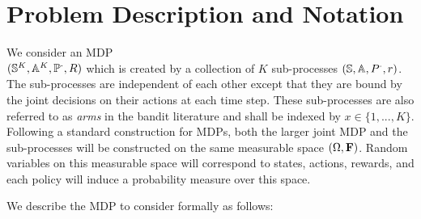 \section{Problem Description and Notation}\label{prob_desc}
We consider an MDP \\ $(\mathbb{S}^K,\mathbb{A}^K,\mathbb{P}^{\cdot},R)$ which is created by a collection of $K$ sub-processes $(\mathbb{S},\mathbb{A},P^{\cdot},r)$. The sub-processes are independent of each other except that they are bound by the joint decisions on their actions at each time step. These sub-processes are also referred to as {\it arms} in the bandit literature and shall be indexed by $x\in\{1,...,K\}$. 
Following a standard construction for MDPs, 
both the larger joint MDP and the sub-processes will be constructed on the same measurable space $(\Omega,\mathbf{F})$.
Random variables on this measurable space will correspond to states, actions, rewards,
and each policy will induce a probability measure over this space.

We describe the MDP to consider formally as follows:

